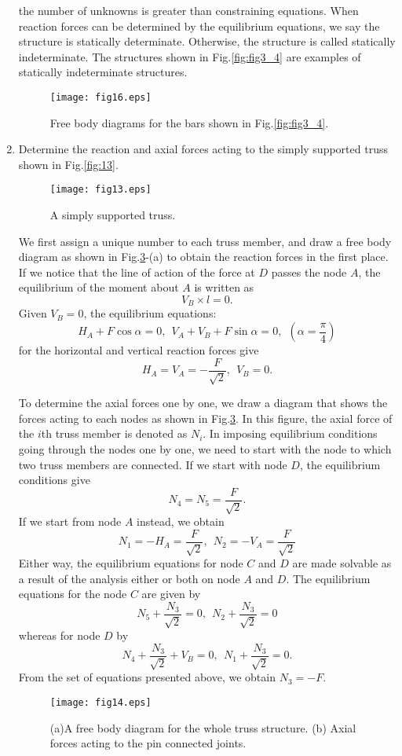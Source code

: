 ﻿\documentclass[10pt,a4j]{article}
\begin{document}
\begin{enumerate}
{	the number of unknowns is greater than constraining equations.  
	When reaction forces can be determined by the equilibrium equations, 
	we say the structure is statically determinate. Otherwise, the structure is 
	called statically indeterminate. The structures shown in Fig.\ref{fig:fig3_4} are 
	 examples of statically indeterminate structures.
}
\begin{figure}[h]
	\begin{center}
	\texttt{[image: fig16.eps]} 
	\end{center}
	\caption{Free body diagrams for the bars shown in Fig.\ref{fig:fig3_4}.} 
	\label{fig:fig16}
\end{figure}
\item
	Determine the reaction and axial forces acting to the simply supported 
	truss shown in Fig.\ref{fig:13}.
\begin{figure}[h]
	\begin{center}
	\texttt{[image: fig13.eps]} 
	\end{center}
	\caption{A simply supported truss. } 
	\label{fig:fig13}
\end{figure}
{\small 
	We first assign a unique number to each truss member, and draw 
	a free body diagram as shown in Fig.\ref{fig:fig14}-(a) to 
	obtain the reaction forces in the first place. 
	If we notice that the line of action of the force at $D$ passes the node $A$, 
	the equilibrium of the moment about $A$ is written as  
	\[
		V_B\times l =0.
	\]
	Given $V_B=0$, the equilibrium equations: 
	\[ 
		H_A+F\cos\alpha =0 , \ \ V_A+V_B+F\sin\alpha=0, \ \ \left( \alpha=\frac{\pi}{4}\right)
	\]
	for the horizontal and vertical reaction forces give
	\[
		H_A=V_A=-\frac{F}{\sqrt{2}}, \ \ V_B=0.
	\]

	To determine the axial forces one by one, we draw a diagram 
	that shows the forces acting to each nodes as shown 
	in Fig.\ref{fig:fig14}. In this figure, the axial force of the $i$th 
	truss member is denoted as $N_i$.
	In imposing equilibrium conditions going through the nodes one by one, 
	we need to start with the node to which two truss members are connected.
	If we start with node $D$, the equilibrium conditions give
	\[ 
		N_4=N_5=\frac{F}{\sqrt{2}}.
	\]
	If we start from node $A$ instead, we obtain
	\[
		N_1=-H_A=\frac{F}{\sqrt{2}}, \ \ 
		N_2=-V_A=\frac{F}{\sqrt{2}}
	\]
	Either way, the equilibrium equations for node $C$ and $D$ are made 
	solvable as a result of the analysis either or both on node $A$ and $D$.
	The equilibrium equations for the node $C$ are given by 
	\[
		N_5+\frac{N_3}{\sqrt{2}}=0, \ \ 
		N_2+\frac{N_3}{\sqrt{2}}=0
	\]
	whereas for node $D$ by
	\[
		N_4+\frac{N_3}{\sqrt{2}}+V_B=0, \ \ 
		N_1+\frac{N_3}{\sqrt{2}}=0.
	\]
	From the set of equations presented above, we obtain $N_3=-F$.
}
\begin{figure}[h]
	\begin{center}
	\texttt{[image: fig14.eps]} 
	\end{center}
	\caption{(a)A free body diagram for the whole truss structure.
	(b) Axial forces acting to the pin connected joints.} 
	\label{fig:fig14}
\end{figure}
\end{enumerate}
\end{document}
